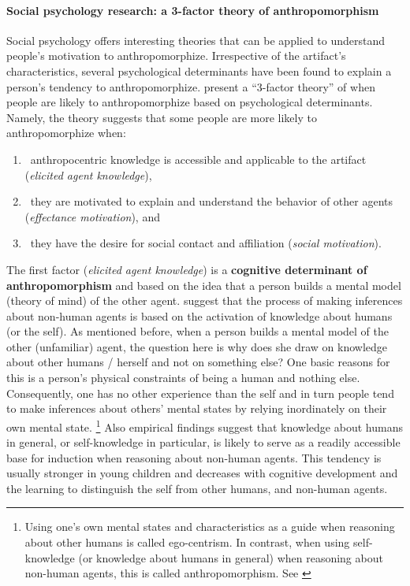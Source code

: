 \documentclass{frontiersSCNS} %
\begin{document}
\paragraph{Social psychology research: a 3-factor theory of anthropomorphism\\}
\label{sec:psychological-factors}

Social psychology offers interesting theories that can be applied to understand people's motivation to anthropomorphize. Irrespective of the artifact's characteristics, several psychological determinants have been found to explain a person's tendency to anthropomorphize. \cite{epley_seeing_2007} present a ``3-factor theory'' of when people are likely to anthropomorphize based on psychological determinants. Namely, the theory suggests that some people are more likely to anthropomorphize when: 

\begin{enumerate}
	\item ~anthropocentric knowledge is accessible and applicable to the artifact (\textit{elicited agent knowledge}),
	\item ~they are motivated to explain and understand the behavior of other agents (\textit{effectance motivation}), and
	\item ~they have the desire for social contact and affiliation (\textit{social motivation}).
\end{enumerate}

The first factor (\textit{elicited agent knowledge}) is a \textbf{cognitive determinant of anthropomorphism} and based on the idea that a person builds a mental model (theory of mind) of the other agent. \cite{epley_seeing_2007} suggest that the process of making inferences about non-human agents is based on the activation of knowledge about humans (or the self). As mentioned before, when a person builds a mental model of the other (unfamiliar) agent, the question here is why does she draw on knowledge about other humans / herself and not on something else? One basic reasons for this is a person's physical constraints of being a human and nothing else. Consequently, one has no other experience than the self and in turn people tend to make inferences about others' mental states by relying inordinately on their own mental state. \footnote{Using one's own mental states and characteristics as a guide when reasoning about other humans is called ego-centrism. In contrast, when using self-knowledge (or knowledge about humans in general) when reasoning about non-human agents, this is called anthropomorphism. See \cite{epley_seeing_2007}} Also empirical findings suggest that knowledge about humans in general, or self-knowledge in particular, is likely to serve as a readily accessible base for induction when reasoning about non-human agents. This tendency is usually stronger in young children and decreases with cognitive development and the learning to distinguish the self from other humans, and non-human agents. 
	
\end{document}

